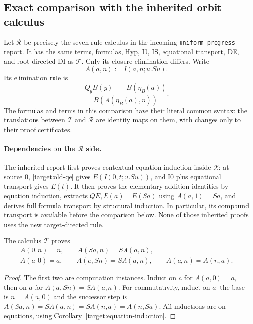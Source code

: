 \subsection{Exact comparison with the inherited orbit calculus}
\label{target:orbit-equivalence-section}

Let $\mathcal R$ be precisely the seven-rule calculus in the incoming
\texttt{uniform\_progress} report.\cite{uniform}  It has the same terms, formulas, Hyp,
I0, IS, equational transport, DE, and root-directed DI as $\mathcal T$.
Only its closure elimination differs.  Write
\[
 A(a,n):=I(a,n;u.Su).
\]
Its elimination rule is
\begin{equation}
 \frac{Q_yB(y)\qquad B(\eta_B(a))}
      {B(A(\eta_B(a),n))}.
 \tag{Orbit QE}\label{target:old-qe}
\end{equation}
The formulas and terms in this comparison have their literal common
syntax; the translations between $\mathcal T$ and $\mathcal R$ are
identity maps on them, with changes only to their proof certificates.

\paragraph{Dependencies on the $\mathcal R$ side.}
The inherited report first proves contextual equation induction inside
$\mathcal R$: at source $0$, \eqref{target:old-qe} gives
$E(I(0,t;u.Su))$, and I0 plus equational transport gives $E(t)$.
It then proves the elementary addition identities by equation induction,
extracts $Q E,E(a)\vdash E(Sa)$ using $A(a,1)=Sa$, and derives full
formula transport by structural induction.  In particular, its compound
transport is available before the comparison below.  None of those
inherited proofs uses the new target-directed rule.

\begin{lemma}
\label{target:addition}
The calculus $\mathcal T$ proves
\[
 \begin{gathered}
 A(0,n)=n,\qquad A(Sa,n)=S A(a,n),\\
 A(a,0)=a,\qquad A(a,Sn)=S A(a,n),\qquad A(a,n)=A(n,a).
 \end{gathered}
\]
\end{lemma}
\begin{proof}
The first two are computation instances.  Induct on $a$ for $A(a,0)=a$,
then on $a$ for $A(a,Sn)=S A(a,n)$.  For commutativity, induct on $a$:
the base is $n=A(n,0)$ and the successor step is
$A(Sa,n)=S A(a,n)=S A(n,a)=A(n,Sa)$.
All inductions are on equations, using
Corollary~\ref{target:equation-induction}.
\end{proof}

